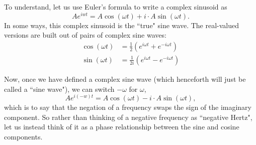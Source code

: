 \documentclass[11pt,preprint]{aastex}
\begin{document}
To understand, let us use
Euler's formula to write a complex sinusoid as
\begin{equation}
Ae^{iwt} = A\cos(\omega t) + i\cdot A\sin(\omega t).
\end{equation}
In some ways, this complex sinusoid is the ``true" sine wave.  The real-valued
versions are built out of pairs of complex sine waves:
\begin{align}
\cos(\omega t) &= \frac12(e^{i\omega t} + e^{-i\omega t}) \\
\sin(\omega t) &= \frac1{2i}(e^{i\omega t} - e^{-i\omega t})
\end{align}

Now, once we have defined a complex sine wave (which henceforth will just be
called a ``sine wave"), we can switch $-\omega$
for $\omega$,
\begin{equation}
Ae^{i(-w)t} = A\cos(\omega t) - i\cdot A\sin(\omega t),
\end{equation}
which is to say that the negation of a frequency swaps the sign of the imaginary 
component.  So rather than thinking of a negative frequency as ``negative Hertz",
let us instead think of it as a phase relationship between the sine and cosine components.
\end{document}
